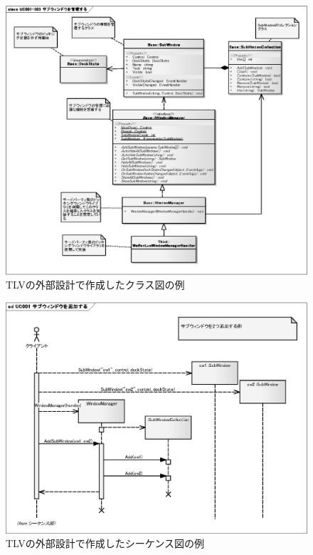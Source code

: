 \begin{figure}[t]
\begin{center}
\includegraphics[width=13cm]{img/class.eps}
\caption{TLVの外部設計で作成したクラス図の例}
\label{fig:class}
\end{center}
\end{figure}

\begin{figure}[t]
\begin{center}
\includegraphics[width=13cm]{img/sequence.eps}
\caption{TLVの外部設計で作成したシーケンス図の例}
\label{fig:sequence}
\end{center}
\end{figure}

